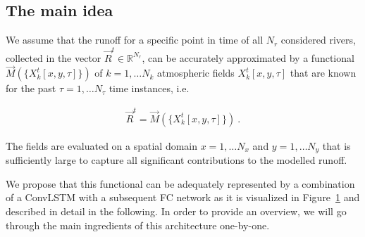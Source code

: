\documentclass[
]{agujournal2019}
\begin{document}
\subsection{The main idea}\label{sec-main_idea}

We assume that the runoff for a specific point in time of all \(N_r\)
considered rivers, collected in the vector
\(\vec{R}^t \in \mathbb{R}^{N_r}\), can be accurately approximated by a
functional \(\vec{M}(\{X^t_k[x,y,\tau]\})\) of \(k=1,\ldots N_k\)
atmospheric fields \(X^t_k[x,y,\tau]\) that are known for the past
\(\tau=1,\ldots N_\tau\) time instances, i.e.

\[
\begin{aligned}
\vec{R}^t = \vec{M}(\{X^t_k[x,y,\tau]\}) \ .
\end{aligned}
\]

The fields are evaluated on a spatial domain \(x=1,\ldots N_x\) and
\(y=1,\ldots N_y\) that is sufficiently large to capture all significant
contributions to the modelled runoff.

We propose that this functional can be adequately represented by a
combination of a ConvLSTM with a subsequent FC network as it is
visualized in Figure~\ref{fig-ConvLSTM_FC} and described in detail in
the following. In order to provide an overview, we will go through the
main ingredients of this architecture one-by-one.

\begin{figure}


\caption{\label{fig-ConvLSTM_FC}}

\end{figure}%
\end{document}
